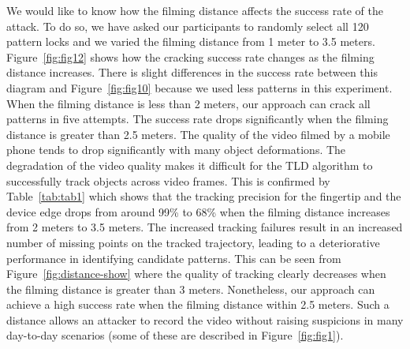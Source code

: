            We would like to know how the filming distance affects the
           success rate of the attack. To do so, we have asked our participants to randomly select all 120
           pattern locks and we varied the
           filming distance from 1 meter to 3.5 meters.
           Figure~\ref{fig:fig12} shows how the cracking success rate changes
           as the filming distance increases. There is slight differences in the success rate between this diagram and Figure~\ref{fig:fig10}
            because we used less patterns in this experiment.
           When the filming distance is less than 2 meters, our approach can crack all patterns in five attempts.
           The success rate drops significantly when
           the filming distance is greater than 2.5 meters.
           The quality of the video filmed by a mobile phone tends to drop significantly with many object deformations. The degradation of the video quality makes it difficult for the TLD algorithm to successfully track objects across video frames.
            This is confirmed by Table~\ref{tab:tab1}
           which shows that the tracking precision for the fingertip and the device edge drops from around 99\% to
           68\% when the filming
           distance increases from 2 meters to 3.5 meters. The increased
           tracking failures result in an increased number of missing
           points on the tracked trajectory, leading to a deteriorative performance in identifying candidate patterns.
           This can be seen from Figure~\ref{fig:distance-show} where the quality
           of tracking clearly decreases when the filming distance is greater
           than 3 meters.
           Nonetheless, our approach can
           achieve a high success rate when the filming distance within
           2.5 meters. Such a distance allows an attacker to
           record the video without raising suspicions in many day-to-day scenarios (some of these are
           described in Figure~\ref{fig:fig1}).

